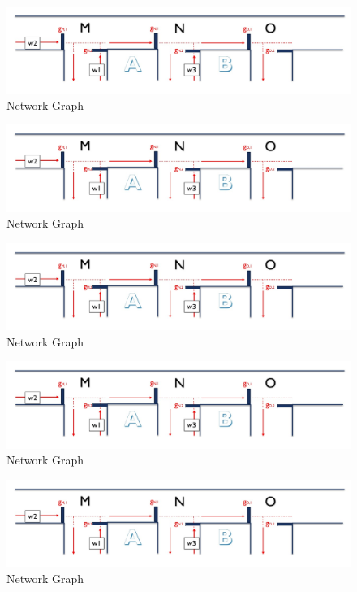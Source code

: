 \documentclass[11pt]{article}
\begin{document}
\begin{figure}
    \caption{Network Graph}
      \centering
	\includegraphics[width=15cm]{network-graph}
\end{figure}

\begin{figure}
    \caption{Network Graph}
      \centering
	\includegraphics[width=15cm]{network-graph}
\end{figure}

\begin{figure}
    \caption{Network Graph}
      \centering
	\includegraphics[width=15cm]{network-graph}
\end{figure}

\begin{figure}
    \caption{Network Graph}
      \centering
	\includegraphics[width=15cm]{network-graph}
\end{figure}

\begin{figure}
    \caption{Network Graph}
      \centering
	\includegraphics[width=15cm]{network-graph}
\end{figure}
\end{document}
